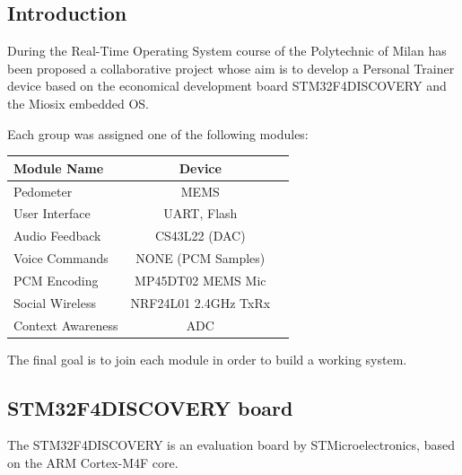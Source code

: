 \documentclass[a4paper,10pt]{article}
\begin{document}
\vspace{4ex}	%
\begin{multicols}{2}

\section{Introduction}
During the Real-Time Operating System course of the Polytechnic of Milan has been
proposed a collaborative project whose aim is to develop a Personal Trainer device
based on the economical development board STM32F4DISCOVERY and the 
Miosix embedded OS. 

Each group was assigned one of the following modules:
{\small
\begin{center}
\begin{tabular}{|l|c|r|} \hline
{\bf Module Name} & {\bf Device}\\ \hline
Pedometer & MEMS \\
User Interface & UART, Flash\\
Audio Feedback & CS43L22 (DAC) \\
Voice Commands & NONE (PCM Samples) \\
PCM Encoding & MP45DT02 MEMS Mic\\
Social Wireless & NRF24L01 2.4GHz TxRx\\
Context Awareness & ADC \\ \hline
\end{tabular}
\end{center}
}

The final goal is to join each module in order to build a working system.

\subsection{STM32F4DISCOVERY board}

The STM32F4DISCOVERY is an evaluation board by STMicroelectronics, based on the ARM Cortex-M4F core.


\end{multicols}
\end{document}
